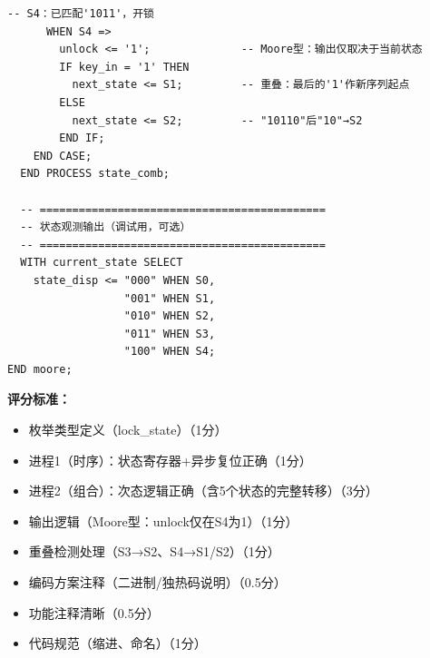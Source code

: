 \begin{lstlisting}[caption={数字密码锁控制器——双进程Moore型VHDL代码}]
      -- S4：已匹配'1011'，开锁
      WHEN S4 =>
        unlock <= '1';              -- Moore型：输出仅取决于当前状态
        IF key_in = '1' THEN
          next_state <= S1;         -- 重叠：最后的'1'作新序列起点
        ELSE
          next_state <= S2;         -- "10110"后"10"→S2
        END IF;
    END CASE;
  END PROCESS state_comb;

  -- ============================================
  -- 状态观测输出（调试用，可选）
  -- ============================================
  WITH current_state SELECT
    state_disp <= "000" WHEN S0,
                  "001" WHEN S1,
                  "010" WHEN S2,
                  "011" WHEN S3,
                  "100" WHEN S4;
END moore;
\end{lstlisting}

\textbf{评分标准：}
\begin{itemize}
  \item 枚举类型定义（lock\_state）（1分）
  \item 进程1（时序）：状态寄存器+异步复位正确（1分）
  \item 进程2（组合）：次态逻辑正确（含5个状态的完整转移）（3分）
  \item 输出逻辑（Moore型：unlock仅在S4为1）（1分）
  \item 重叠检测处理（S3→S2、S4→S1/S2）（1分）
  \item 编码方案注释（二进制/独热码说明）（0.5分）
  \item 功能注释清晰（0.5分）
  \item 代码规范（缩进、命名）（1分）
\end{itemize}

\endinput
